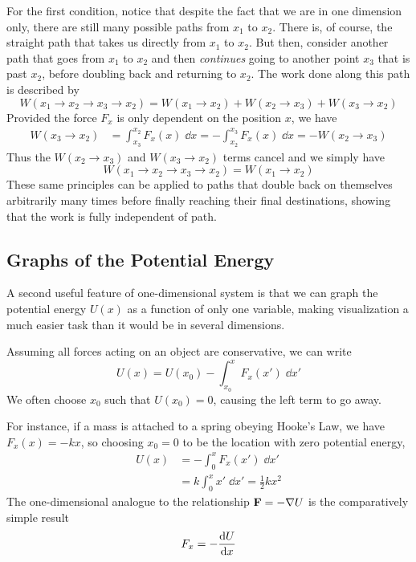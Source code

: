 For the first condition, notice that despite the fact that we are in one dimension only, there are still many possible paths from $x_1$ to $x_2$. There is, of course, the straight path that takes us directly from $x_1$ to $x_2$. But then, consider another path that goes from $x_1$ to $x_2$ and then \textit{continues} going to another point $x_3$ that is past $x_2$, before doubling back and returning to $x_2$. The work done along this path is described by
\[ W(x_1\to x_2 \to x_3\to x_2) = W(x_1\to x_2) + W(x_2\to x_3) + W(x_3\to x_2) \]
Provided the force $F_x$ is only dependent on the position $x$, we have
\begin{align*}
    W(x_3\to x_2) &= \int_{x_3}^{x_2}F_x(x)\; \dd x = -\int_{x_2}^{x_3} F_x(x) \; \dd x = -W(x_2\to x_3)
\end{align*}
Thus the $W(x_2\to x_3)$ and $W(x_3\to x_2)$ terms cancel and we simply have
\[ W(x_1\to x_2\to x_3 \to x_2) = W(x_1\to x_2)\]
These same principles can be applied to paths that double back on themselves arbitrarily many times before finally reaching their final destinations, showing that the work is fully independent of path. 
\subsection*{Graphs of the Potential Energy}
A second useful feature of one-dimensional system is that we can graph the potential energy $U(x)$ as a function of only one variable, making visualization a much easier task than it would be in several dimensions.

Assuming all forces acting on an object are conservative, we can write
\[ U(x) = U(x_0)-\int_{x_0}^x F_x(x')\; \dd x'\]
We often choose $x_0$ such that $U(x_0) = 0$, causing the left term to go away.

For instance, if a mass is attached to a spring obeying Hooke's Law, we have $F_x(x) = -kx$, so choosing $x_0=0$ to be the location with zero potential energy,
\begin{align*}
    U(x) &= -\int_0^x F_x(x')\; \dd x' \\
    &= k\int_0^x x' \; \dd x' = \frac{1}{2}kx^2 
\end{align*}
The one-dimensional analogue to the relationship $\mathbf{F} = -\nabla U$ is the comparatively simple result
\[ F_x = -\dv{U}{x} \]


